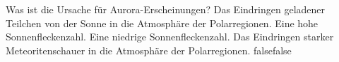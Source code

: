     {Was ist die Ursache für Aurora-Erscheinungen?}
    {Das Eindringen geladener Teilchen von der Sonne in die Atmosphäre der Polarregionen.}
    {Eine hohe Sonnenfleckenzahl.}
    {Eine niedrige Sonnenfleckenzahl.}
    {Das Eindringen starker Meteoritenschauer in die Atmosphäre der Polarregionen.}
    {false}{false}